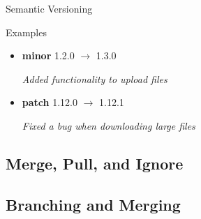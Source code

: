 \begin{frame}{Semantic Versioning}
\begin{fancycolumns}
\begin{example}{Examples}
\begin{itemize}
				\item \textbf{minor} 1.2.0 $\rightarrow$ 1.3.0
				
				\textit{Added functionality to upload files}
				
				\item \textbf{patch} 1.12.0 $\rightarrow$ 1.12.1
				
				\textit{Fixed a bug when downloading large files}
				
			\end{itemize}
		\end{example}
	\end{fancycolumns}
\end{frame}


\subsection{Merge, Pull, and Ignore}
\slideMergePull

\slideIgnore

\subsection{Branching and Merging}
\begin{frame}{\insertsubsection}
	\slideBranchingAndMerging
\end{frame}

